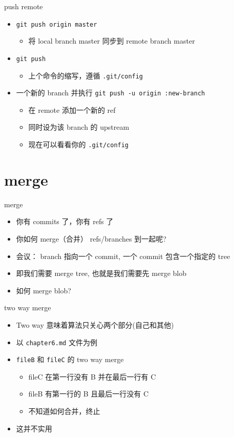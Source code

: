 \documentclass[aspectratio=169]{beamer}
\newcommand{\T}[1]{\texttt{#1}}
\begin{document}
\begin{frame}{push remote}
  \begin{itemize}
    \item<1-> \T{git push origin master}\begin{itemize}
      \item 将 local branch master 同步到 remote branch master
    \end{itemize}
    \item<2-> \T{git push}\begin{itemize}
      \item 上个命令的缩写，遵循 \T{.git/config}
    \end{itemize}
    \item<3-> 一个新的 branch 并执行 \T{git push -u origin :new-branch}\begin{itemize}
      \item 在 remote 添加一个新的 ref
      \item 同时设为该 branch 的 upstream
      \item 现在可以看看你的 \T{.git/config}
    \end{itemize}
  \end{itemize}
\end{frame}

\section{merge}
\begin{frame}{merge}
  \begin{itemize}
    \item 你有 commits 了，你有 refs 了
    \item 你如何 merge（合并） refs/branches 到一起呢?
    \item 会议： branch 指向一个 commit, 一个 commit 包含一个指定的 tree
    \item 即我们需要 merge tree, 也就是我们需要先 merge blob 
    \item 如何 merge blob?
  \end{itemize}
\end{frame}

\begin{frame}{two way merge}
  \begin{itemize}
    \item Two way 意味着算法只关心两个部分(自己和其他)
    \item 以 \T{chapter6.md} 文件为例
    \item \T{fileB} 和 \T{fileC} 的 two way merge \begin{itemize}
      \item fileC 在第一行没有 B 并在最后一行有 C
	  \item fileB 有第一行的 B 且最后一行没有 C
      \item 不知道如何合并，终止
    \end{itemize}
    \item 这并不实用
  \end{itemize}
\end{frame}
\end{document}
